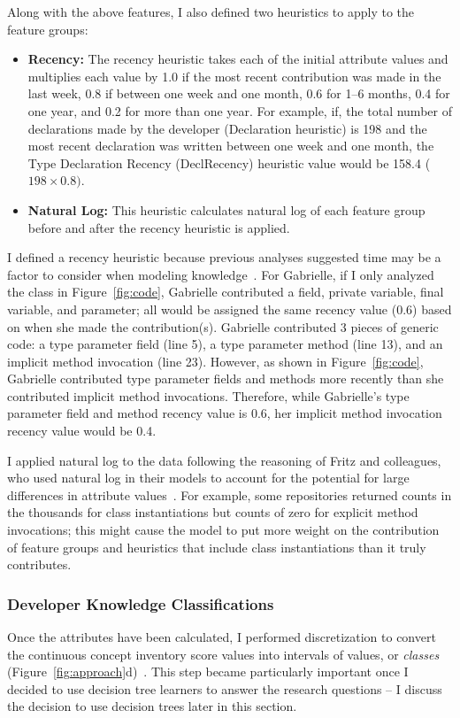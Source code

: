 Along with the above features, I also defined two heuristics to apply to the feature groups:

\begin{itemize}
	\item \textbf{Recency:} The recency heuristic takes each of the initial attribute values and multiplies each value by 1.0 if the most recent contribution was made in the last week, 0.8 if between one week and one month, 0.6 for 1--6 months, 0.4 for one year, and 0.2 for more than one year.
	For example, if, the total number of declarations made by the developer (Declaration heuristic) is 198 and the most recent declaration was written between one week and one month, the Type Declaration Recency (DeclRecency) heuristic value would be 158.4 (\(198 \times 0.8)\). 
	\item \textbf{Natural Log:} This heuristic calculates natural log of each feature group before and after the recency heuristic is applied.
\end{itemize}

I defined a recency heuristic because previous analyses suggested time may be a factor to consider when modeling knowledge~\cite{johnson2015bespoke}. 
For Gabrielle, if I only analyzed the class in Figure~\ref{fig:code}, Gabrielle contributed a field, private variable, final variable, and parameter; all would be assigned the same recency value (0.6) based on when she made the contribution(s).
Gabrielle contributed 3 pieces of generic code: a type parameter field (line 5), a type parameter method (line 13), and an implicit method invocation (line 23). However, as shown in Figure~\ref{fig:code}, Gabrielle contributed type parameter fields and methods more recently than she contributed implicit method invocations. Therefore, while Gabrielle's type parameter field and method recency value is 0.6, her implicit method invocation recency value would be 0.4.

I applied natural log to the data following the reasoning of Fritz and colleagues, who used natural log in their models to account for the potential for large differences in attribute values~\cite{fritz2010degree}. For example, some repositories returned counts in the thousands for class instantiations but counts of zero for explicit method invocations; this might cause the model to put more weight on the contribution of feature groups and heuristics that include class instantiations than it truly contributes.

\subsubsection{Developer Knowledge Classifications}
Once the attributes have been calculated, I performed discretization to convert the continuous concept inventory score values into intervals of values, or \emph{classes} (Figure~\ref{fig:approach}d)~\cite{fayyad1993multi}. This step became particularly important once I decided to use decision tree learners to answer the research questions -- I discuss the decision to use decision trees later in this section.

